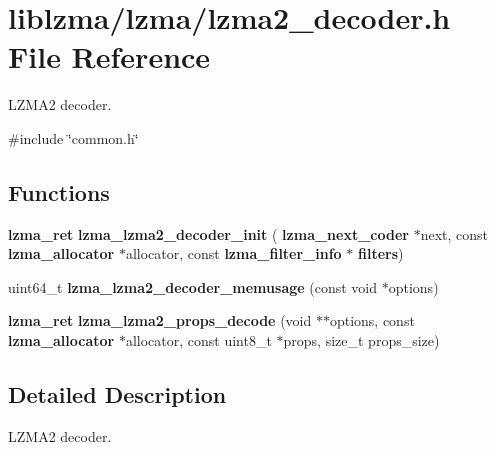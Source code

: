 \section{liblzma/lzma/lzma2\+\_\+decoder.h File Reference}
\label{lzma2__decoder_8h}


L\+Z\+M\+A2 decoder.  


{\ttfamily \#include \char`\"{}common.\+h\char`\"{}}\newline
\subsection*{Functions}
\begin{DoxyCompactItemize}
\item 
\mbox{\label{lzma2__decoder_8h_a06f2420551164b6ef499499cbcafaa81}} 
\textbf{ lzma\+\_\+ret} {\bfseries lzma\+\_\+lzma2\+\_\+decoder\+\_\+init} (\textbf{ lzma\+\_\+next\+\_\+coder} $\ast$next, const \textbf{ lzma\+\_\+allocator} $\ast$allocator, const \textbf{ lzma\+\_\+filter\+\_\+info} $\ast$\textbf{ filters})
\item 
\mbox{\label{lzma2__decoder_8h_a1c1e1c878fab104400c9917efc2e2e1c}} 
uint64\+\_\+t {\bfseries lzma\+\_\+lzma2\+\_\+decoder\+\_\+memusage} (const void $\ast$options)
\item 
\mbox{\label{lzma2__decoder_8h_ad31fbaf11f690275372ff5af82e98e67}} 
\textbf{ lzma\+\_\+ret} {\bfseries lzma\+\_\+lzma2\+\_\+props\+\_\+decode} (void $\ast$$\ast$options, const \textbf{ lzma\+\_\+allocator} $\ast$allocator, const uint8\+\_\+t $\ast$props, size\+\_\+t props\+\_\+size)
\end{DoxyCompactItemize}


\subsection{Detailed Description}
L\+Z\+M\+A2 decoder. 

